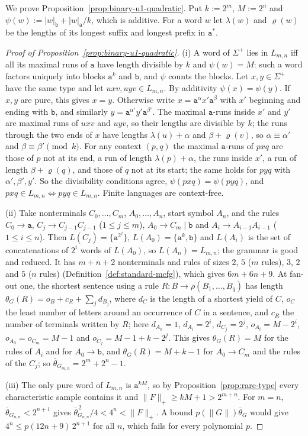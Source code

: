 \documentclass[11pt]{article}
\numberwithin{equation}{section}
\theoremstyle{plain}
\theoremstyle{definition}
\theoremstyle{remark}
\theoremstyle{plain}
\begin{document}
We prove Proposition~\ref{prop:binary-u1-quadratic}.  Put
$k:=2^m$, $M:=2^n$ and $\psi(w):=|w|_{\mathtt b}+|w|_{\mathtt a}/k$, which is
additive.  For a word $w$ let $\lambda(w)$ and $\varrho(w)$ be the lengths of its
longest suffix and longest prefix in $\mathtt a^*$.

\begin{proof}[Proof of Proposition~\ref{prop:binary-u1-quadratic}]
(i) A word of $\Sigma^+$ lies in $L_{m,n}$ iff all its maximal runs of $\mathtt a$
have length divisible by $k$ and $\psi(w)=M$: such a word factors uniquely into
blocks $\mathtt a^k$ and $\mathtt b$, and $\psi$ counts the blocks.  Let
$x,y\in\Sigma^+$ have the same type and let $uxv,uyv\in L_{m,n}$.  By additivity
$\psi(x)=\psi(y)$.  If $x,y$ are pure, this gives $x=y$.  Otherwise write
$x=\mathtt a^{\alpha}x'\mathtt a^{\beta}$ with $x'$ beginning and ending with
$\mathtt b$, and similarly $y=\mathtt a^{\alpha'}y'\mathtt a^{\beta'}$.  The maximal
$\mathtt a$-runs inside $x'$ and $y'$ are maximal runs of $uxv$ and $uyv$, so their
lengths are divisible by $k$; the runs through the two ends of $x$ have lengths
$\lambda(u)+\alpha$ and $\beta+\varrho(v)$, so $\alpha\equiv\alpha'$ and
$\beta\equiv\beta'\pmod k$.  For any context $(p,q)$ the maximal $\mathtt a$-runs of
$pxq$ are those of $p$ not at its end, a run of length $\lambda(p)+\alpha$, the
runs inside $x'$, a run of length $\beta+\varrho(q)$, and those of $q$ not at its
start; the same holds for $pyq$ with $\alpha',\beta',y'$.  So the divisibility
conditions agree, $\psi(pxq)=\psi(pyq)$, and $pxq\in L_{m,n}\iff pyq\in L_{m,n}$.
Finite languages are context-free.

(ii) Take nonterminals $C_0,\ldots,C_m$, $A_0,\ldots,A_n$, start symbol $A_n$, and the
rules $C_0\to\mathtt a$, $C_j\to C_{j-1}C_{j-1}$ ($1\le j\le m$),
$A_0\to C_m\mid\mathtt b$ and $A_i\to A_{i-1}A_{i-1}$ ($1\le i\le n$).  Then
$L(C_j)=\{\mathtt a^{2^j}\}$, $L(A_0)=\{\mathtt a^k,\mathtt b\}$ and $L(A_i)$ is the
set of concatenations of $2^i$ words of $L(A_0)$, so $L(A_n)=L_{m,n}$; the grammar
is good and reduced.  It has $m+n+2$ nonterminals and rules of sizes $2$, $5$
($m$ rules), $3$, $2$ and $5$ ($n$ rules) (Definition~\ref{def:standard-mcfg}),
which gives $6m+6n+9$.  At fan-out one, the shortest sentence using a rule
$R:B\to\rho(B_1,\ldots,B_q)$ has length $\theta_G(R)=o_B+c_R+\sum_jd_{B_j}$, where
$d_C$ is the length of a shortest yield of $C$, $o_C$ the least number of letters
around an occurrence of $C$ in a sentence, and $c_R$ the number of terminals
written by $R$; here
$d_{A_0}=1$, $d_{A_i}=2^i$, $d_{C_j}=2^j$, $o_{A_i}=M-2^i$, $o_{A_0}=o_{C_m}=M-1$ and
$o_{C_j}=M-1+k-2^j$.  This gives $\theta_G(R)=M$ for the rules of $A_i$ and for
$A_0\to\mathtt b$, and $\theta_G(R)=M+k-1$ for $A_0\to C_m$ and the rules of the
$C_j$; so $\bar\theta_{G_{m,n}}=2^m+2^n-1$.

(iii) The only pure word of $L_{m,n}$ is $\mathtt a^{kM}$, so by
Proposition~\ref{prop:rare-type} every characteristic sample contains it and
$\|F\|_+\ge kM+1>2^{m+n}$.  For $m=n$, $\bar\theta_{G_{n,n}}<2^{n+1}$ gives
$\bar\theta_{G_{n,n}}^{\,2}/4<4^n<\|F\|_+$.  A bound $p(\|G\|)\bar\theta_G$ would give
$4^n\le p(12n+9)\,2^{n+1}$ for all $n$, which fails for every polynomial $p$.
\end{proof}
\end{document}
